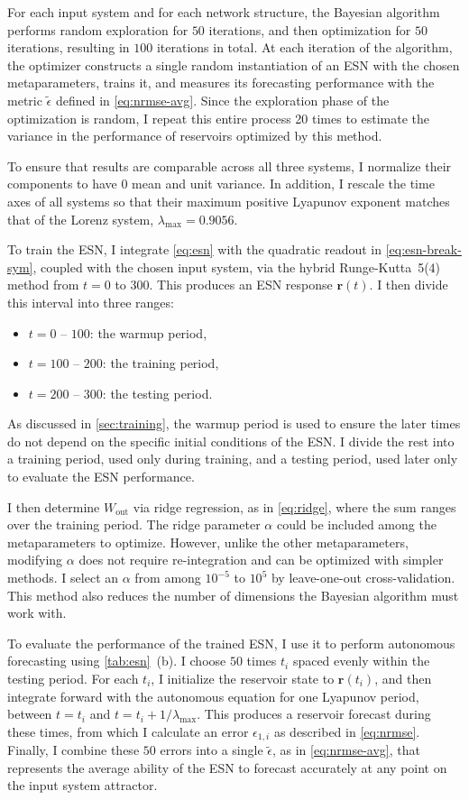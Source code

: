 For each input system and for each network structure, the Bayesian
algorithm performs random exploration for $50$ iterations, and then
optimization for $50$ iterations, resulting in $100$ iterations in
total. At each iteration of the algorithm, the optimizer constructs a
single random instantiation of an ESN with the chosen metaparameters,
trains it, and measures its forecasting performance with the metric
$\tilde{\epsilon}$ defined in \cref{eq:nrmse-avg}. Since the
exploration phase of the optimization is random, I repeat this entire
process 20 times to estimate the variance in the performance of
reservoirs optimized by this method.

To ensure that results are comparable across all three systems, I
normalize their components to have $0$ mean and unit variance. In
addition, I rescale the time axes of all systems so that their maximum
positive Lyapunov exponent matches that of the Lorenz system,
$\lambda_\text{max} = 0.9056$.

To train the ESN, I integrate \cref{eq:esn} with the quadratic readout
in \cref{eq:esn-break-sym}, coupled with the chosen input system, via
the hybrid Runge-Kutta~5(4)\cite{dormand1980} method from $t = 0$ to
$300$. This produces an ESN response $\bm{r}(t)$. I then divide this interval into three ranges:
\begin{itemize}
\item $t = 0$ -- $100$: the warmup period,
\item $t = 100$ -- $200$: the training period,
\item $t = 200$ -- $300$: the testing period.
\end{itemize}
As discussed in \cref{sec:training}, the warmup period is used to
ensure the later times do not depend on the specific initial
conditions of the ESN. I divide the rest into a training period, used
only during training, and a testing period, used later only to
evaluate the ESN performance.

I then determine $W_\text{out}$ via ridge regression, as in
\cref{eq:ridge}, where the sum ranges over the training period. The
ridge parameter $\alpha$ could be included among the metaparameters to
optimize. However, unlike the other metaparameters, modifying $\alpha$
does not require re-integration and can be optimized with simpler
methods. I select an $\alpha$ from among $10^{-5}$ to $10^5$ by
leave-one-out cross-validation. This method also reduces the number of
dimensions the Bayesian algorithm must work with.

To evaluate the performance of the trained ESN, I use it to perform
autonomous forecasting using \cref{tab:esn}~(b). I choose $50$ times
$t_i$ spaced evenly within the testing period. For each $t_i$, I
initialize the reservoir state to $\mathbf{r}(t_i)$, and then
integrate forward with the autonomous equation for one Lyapunov
period, between $t = t_i$ and $t = t_i + 1 / \lambda_\text{max}$. This
produces a reservoir forecast during these times, from which I
calculate an error $\epsilon_{1,i}$ as described in
\cref{eq:nrmse}. Finally, I combine these $50$ errors into a single
$\tilde{\epsilon}$, as in \cref{eq:nrmse-avg}, that represents the
average ability of the ESN to forecast accurately at any point on the
input system attractor.

